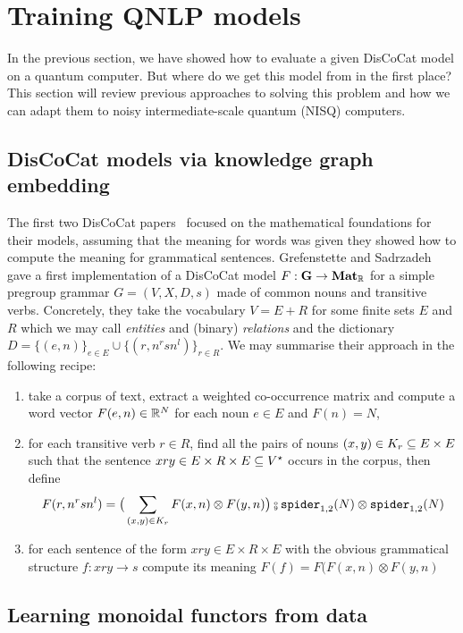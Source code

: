 
\section{Training QNLP models}

In the previous section, we have showed how to evaluate a given DisCoCat model on a quantum computer.
But where do we get this model from in the first place?
This section will review previous approaches to solving this problem and how we can adapt them to noisy intermediate-scale quantum (NISQ) computers.

\subsection{DisCoCat models via knowledge graph embedding}

The first two DisCoCat papers~\cite{ClarkEtAl08,ClarkEtAl10} focused on the mathematical foundations for their models, assuming that the meaning for words was given they showed how to compute the meaning for grammatical sentences.
Grefenstette and Sadrzadeh~\cite{GrefenstetteSadrzadeh11} gave a first implementation of a DisCoCat model $F : \mathbf{G} \to \mathbf{Mat}_{\mathbb{R}}$ for a simple pregroup grammar $G = (V, X, D, s)$ made of common nouns and transitive verbs.
Concretely, they take the vocabulary $V = E + R$ for some finite sets $E$ and $R$ which we may call \emph{entities} and (binary) \emph{relations} and the dictionary $D = \{ (e, n) \}_{e \in E} \cup \{ (r, n^r s n^l) \}_{r \in R}$.
We may summarise their approach in the following recipe:
\begin{enumerate}
\item take a corpus of text, extract a weighted co-occurrence matrix and compute a word vector $F(e, n) \in \mathbb{R}^N$ for each noun $e \in E$ and $F(n) = N$,
\item for each transitive verb $r \in R$, find all the pairs of nouns $(x, y) \in K_r \subseteq E \times E$ such that the sentence $x r y \in E \times R \times E \subseteq V^\star$ occurs in the corpus, then define
$$F(r, n^r s n^l) = \big( \sum_{(x, y) \in K_r} F(x, n) \otimes F(y, n) \big) \fcmp \spider_{1, 2}(N) \otimes \spider_{1, 2}(N)$$
\item for each sentence of the form $x r y \in E \times R \times E$ with the obvious grammatical structure $f : x r y \to s$ compute its meaning $F(f) = F(F(x, n) \otimes F(y, n)$
\end{enumerate}

\subsection{Learning monoidal functors from data}

\subsection{}
